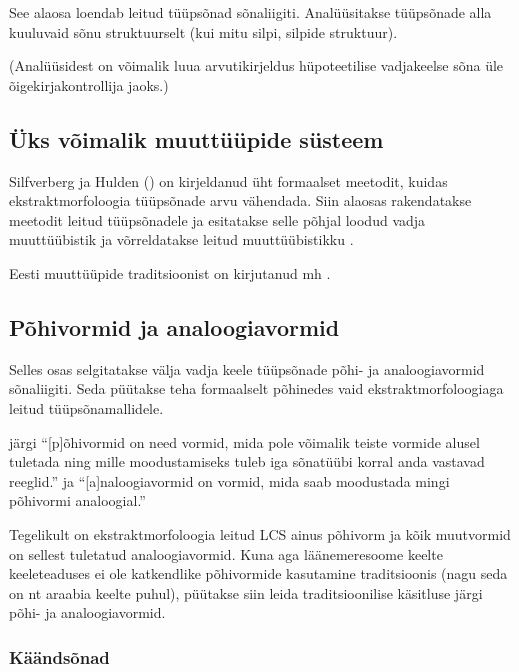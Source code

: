 \documentclass[12pt,a4paper]{article}
\begin{document}
See alaosa loendab leitud tüüpsõnad sõnaliigiti. Analüüsitakse tüüpsõnade alla kuuluvaid sõnu struktuurselt (kui mitu silpi, silpide struktuur).

(Analüüsidest on võimalik luua arvutikirjeldus hüpoteetilise vadjakeelse sõna üle õigekirjakontrollija jaoks.)




\subsection{Üks võimalik muuttüüpide süsteem}
\label{sec:muuttüüpide-süsteem}

Silfverberg ja Hulden (\citeyear{silfverberg_computational_2018}) on kirjeldanud üht formaalset meetodit, kuidas ekstrakt\-morfoloogia tüüpsõnade arvu vähendada. Siin alaosas rakendatakse meetodit leitud tüüpsõnadele ja esitatakse selle põhjal loodud vadja muuttüübistik ja võrreldatakse leitud muuttüübistikku .

Eesti muuttüüpide traditsioonist on kirjutanud mh \cite{viks_muuttuubid_nodate}.




\subsection{Põhivormid ja analoogiavormid}

Selles osas selgitatakse välja vadja keele tüüpsõnade põhi- ja analoogiavormid sõnaliigiti. Seda püütakse teha formaalselt põhinedes vaid ekstrakt\-morfoloogiaga leitud tüüpsõnamallidele.

\cite{erelt_eesti_2007} järgi ``[p]õhivormid on need vormid, mida pole võimalik teiste vormide alusel tuletada ning mille moodustamiseks tuleb iga sõnatüübi korral anda vastavad reeglid.'' ja ``[a]naloogiavormid on vormid, mida saab moodustada mingi põhivormi analoogial.''

Tegelikult on ekstraktmorfoloogia leitud LCS ainus põhivorm ja kõik muutvormid on sellest tuletatud analoogiavormid. Kuna aga läänemeresoome keelte keeleteaduses ei ole katkendlike põhivormide kasutamine traditsioonis (nagu seda on nt araabia keelte puhul), püütakse siin leida traditsioonilise käsitluse järgi põhi- ja analoogiavormid.

\subsubsection{Käändsõnad}
\end{document}
